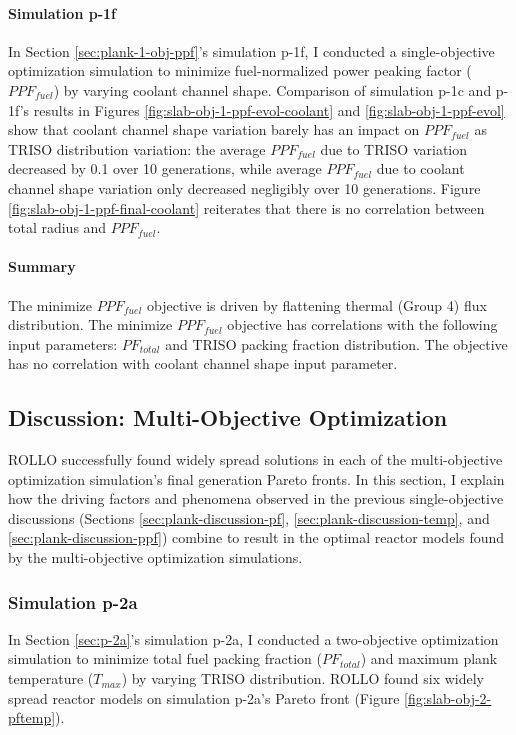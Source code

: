 \paragraph{Simulation p-1f}
In Section \ref{sec:plank-1-obj-ppf}'s simulation p-1f, I conducted a single-objective 
optimization simulation to minimize fuel-normalized power peaking factor ($PPF_{fuel}$) 
by varying coolant channel shape.
Comparison of simulation p-1c and p-1f's results in Figures 
\ref{fig:slab-obj-1-ppf-evol-coolant} and \ref{fig:slab-obj-1-ppf-evol}
show that coolant channel shape variation barely has an impact on $PPF_{fuel}$ as 
\gls{TRISO} distribution variation: the average $PPF_{fuel}$ due to \gls{TRISO} 
variation decreased by 0.1 over 10 generations, while average $PPF_{fuel}$ due to 
coolant channel shape variation only decreased negligibly over 10 generations. 
Figure \ref{fig:slab-obj-1-ppf-final-coolant} reiterates that there is no correlation 
between total radius and $PPF_{fuel}$. 

\paragraph{Summary}
The minimize $PPF_{fuel}$ objective is driven by flattening thermal (Group 4) flux 
distribution. 
The minimize $PPF_{fuel}$ objective has correlations with the following input parameters: 
$PF_{total}$ and TRISO packing fraction distribution. 
The objective has no correlation with coolant channel shape input parameter.

\subsection{Discussion: Multi-Objective Optimization}
\label{sec:plank-discussion-multi}
\gls{ROLLO} successfully found widely spread solutions in each of the multi-objective 
optimization simulation's final generation Pareto fronts.
In this section, I explain how the driving factors and phenomena observed in 
the previous single-objective discussions (Sections 
\ref{sec:plank-discussion-pf}, \ref{sec:plank-discussion-temp}, and 
\ref{sec:plank-discussion-ppf}) combine to result in the optimal reactor models found 
by the multi-objective optimization simulations. 

\subsubsection{Simulation p-2a}
In Section \ref{sec:p-2a}'s simulation p-2a, I conducted a two-objective 
optimization simulation to minimize total fuel packing fraction ($PF_{total}$) and 
maximum plank temperature ($T_{max}$) by varying TRISO distribution. 
\gls{ROLLO} found six widely spread reactor models on simulation p-2a's Pareto 
front (Figure \ref{fig:slab-obj-2-pftemp}). 

